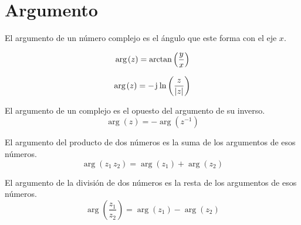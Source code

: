 \section{Argumento}

El argumento de un número complejo es el ángulo que este forma con el eje $x$.

\begin{mdframed}[style=DefinitionFrame]
    \begin{defn}
    \end{defn}
    \begin{equation*}
        \mathop{\mathrm{arg}}\mkern2mu(z) = \arctan \left(\frac{y}{x}\right)
    \end{equation*}
\end{mdframed}

\begin{mdframed}[style=PropertyFrame]
    \begin{prop}
    \end{prop}
    \begin{equation*}
        \mathop{\mathrm{arg}}\mkern2mu(z) = - \mkern2mu\mathrm{j}\mkern1mu \ln \left( \frac{z}{{\left| {z} \right|}} \right)
    \end{equation*}
\end{mdframed}

\begin{mdframed}[style=PropertyFrame]
    \begin{prop}
    \end{prop}
    El argumento de un complejo es el opuesto del argumento de su inverso.
    \begin{equation*}
        \arg(z) = - \arg(z^{-1})
    \end{equation*}
\end{mdframed}

\begin{mdframed}[style=PropertyFrame]
    \begin{prop}
    \end{prop}
    El argumento del producto de dos números es la suma de los argumentos de esos números.
    \begin{equation*}
        \arg (z_1 \, z_2) = \arg(z_1) + \arg(z_2)
    \end{equation*}
\end{mdframed}

\begin{mdframed}[style=PropertyFrame]
    \begin{prop}
    \end{prop}
    El argumento de la división de dos números es la resta de los argumentos de esos números.
    \begin{equation*}
        \arg \left( \dfrac{z_1}{z_2} \right) = \arg(z_1) - \arg(z_2)
    \end{equation*}
\end{mdframed}

